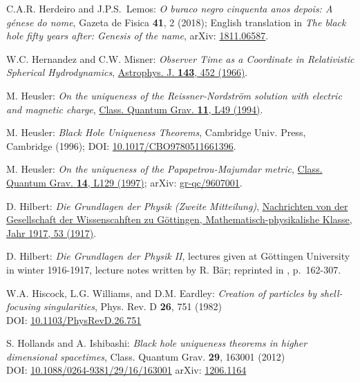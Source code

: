 \begin{thebibliography}{123}
C.A.R. Herdeiro and J.P.S.~Lemos:
\emph{O buraco negro cinquenta anos depois:
A génese do nome},
Gazeta de Fisica {\bf 41}, 2 (2018); English translation in
\emph{The black hole fifty years after: Genesis of the name},
arXiv: \href{https://arxiv.org/abs/1811.06587}{1811.06587}.

W.C. Hernandez and C.W. Misner:
{\em Observer Time as a Coordinate in Relativistic Spherical Hydrodynamics},
\href{https://doi.org/10.1086/148525}{Astrophys. J. {\bf 143}, 452 (1966)}.

M. Heusler:
{\em On the uniqueness of the Reissner-Nordström solution with electric and magnetic charge},
\href{https://doi.org/10.1088/0264-9381/11/3/003}{Class. Quantum Grav. {\bf 11}, L49 (1994)}.

M. Heusler:
{\em Black Hole Uniqueness Theorems},
Cambridge Univ. Press, Cambridge (1996);
DOI: \href{https://doi.org/10.1017/CBO9780511661396}{10.1017/CBO9780511661396}.

M. Heusler:
{\em On the uniqueness of the Papapetrou-Majumdar metric},
\href{https://doi.org/10.1088/0264-9381/14/7/001}{Class. Quantum Grav. {\bf 14}, L129 (1997)};
arXiv: \href{https://arxiv.org/abs/gr-qc/9607001}{gr-qc/9607001}.

D. Hilbert:
{\em Die Grundlagen der Physik (Zweite Mitteilung)},
\href{https://gdz.sub.uni-goettingen.de/id/PPN252457811_1917}{Nachrichten von der Gesellschaft der Wissenscahften zu Göttingen, Mathematisch-physikalishe Klasse, Jahr 1917, 53 (1917)}.

D. Hilbert:
{\em Die Grundlagen der Physik II},
lectures given at Göttingen University in winter 1916-1917,
lecture notes written by R. Bär; reprinted
in \cite{SauerM09}, p.~162-307.

W.A. Hiscock, L.G. Williams, and D.M. Eardley:
{\em Creation of particles by shell-focusing singularities},
Phys. Rev. D {\bf 26}, 751 (1982)\\
DOI: \href{https://doi.org/10.1103/PhysRevD.26.751}{10.1103/PhysRevD.26.751}

S. Hollands and A. Ishibashi:
{\em Black hole uniqueness theorems in higher dimensional spacetimes},
Class. Quantum Grav. {\bf 29}, 163001 (2012)\\
DOI: \href{https://doi.org/10.1088/0264-9381/29/16/163001}{10.1088/0264-9381/29/16/163001}\hfill
arXiv: \href{https://arxiv.org/abs/1206.1164}{1206.1164}


\end{thebibliography}
